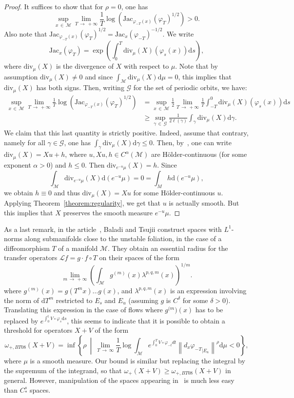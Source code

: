 \documentclass[AHL,Unicode,longabstracts,published]{cedram}
\newcommand{\mc}{\mathcal}
\newcommand{\M}{\mathcal{M}}
\newcommand{\ClL}{\mathcal{L}}
\newcommand{\dd}{\mathrm{d}}
\newcommand{\divv}{\mathrm{div}}
\newcommand{\Jac}{\mathrm{Jac}}
\begin{document}
\begin{proof}
It suffices to show that for $\rho=0$, one has
\[
\sup_{x\,\in\,\M} \lim_{T\,\to\,+\infty} \frac{1}{T}\log \left(\Jac_{\varphi_{-T}(x)}(\varphi_T)^{1/2} \right) > 0.
\]
Also note that $\Jac_{\varphi_{-T}(x)}(\varphi_T)^{1/2} = \Jac_{x}(\varphi_{-T})^{-1/2}$. We write
\[
\Jac_x(\varphi_{T}) = \exp\left(\int_0^T \divv_\mu(X)(\varphi_s(x)) \dd s \right),
\]
where $\divv_\mu(X)$ is the divergence of $X$ with respect to $\mu$. Note that by assumption $\divv_\mu(X) \neq 0$ and since $\int_{\M} \divv_\mu(X) \dd \mu = 0$, this implies that $\divv_\mu(X)$ has both signs. Then, writing $\mc{G}$ for the set of periodic orbits, we have:
\begin{align*}
\sup_{x\,\in\,\M} \lim_{T\,\to\,+\infty} \frac{1}{T}\log \left(\Jac_{\varphi_{-T}(x)}(\varphi_T)^{1/2} \right)& = \sup_{x\,\in\,\M} \frac{1}{2} \lim_{T\,\to\,+\infty} \frac{1}{T} \int_{-T}^{0} \divv_\mu(X)(\varphi_s(x)) \dd s \\
& \geq \sup_{\gamma\,\in\,\mc{G}} \frac{1}{2\ell(\gamma)} \int_\gamma \divv_\mu(X) \dd \gamma.
\end{align*}
We claim that this last quantity is strictly positive. Indeed, assume that contrary, namely for all $\gamma \in \mc{G}$, one has $\int_\gamma \divv_\mu(X) \dd \gamma \leq 0$. Then, by~\cite{Lopes-Thieullen-05}, one can write $\divv_\mu(X) = Xu + h$, where $u,Xu,h \in C^\alpha(\M)$ are H\"older-continuous (for some exponent $\alpha > 0$) and $h \leq 0$. Then $\divv_{e^{-u} \mu}(X) = h$. Since
\[
\int_{\M} \divv_{e^{-u }\mu}(X) \dd(e^{-u} \mu) = 0 = \int_{M} h \dd (e^{-u} \mu),
\]
we obtain $h \equiv 0$ and thus $\divv_\mu(X) = Xu$ for some H\"older-continuous $u$. Applying Theorem~\ref{theorem:regularity}, we get that $u$ is actually smooth. But this implies that $X$ preserves the smooth measure $e^{-u}\mu$.
\end{proof}

As a last remark, in the article~\cite{Baladi-Tsujii-08}, Baladi and Tsujii construct spaces with $L^1$-norms along submanifolds close to the unstable foliation, in the case of a diffeomorphism $T$ of a manifold $\M$. They obtain an essential radius for the transfer operators $\ClL f = g\cdot f\circ T$ on their spaces of the form
\[
\lim_{m\,\to\,+\infty} \left(\int_{\M} g^{(m)}(x) \lambda^{p,q,m}(x) \right)^{1/m}.
\]
where $g^{(m)}(x) = g(T^m x)\dots g(x)$, and $\lambda^{p,q,m}(x)$ is an expression involving the norm of $\dd T^m$ restricted to $E_s$ and $E_u$ (assuming $g$ is $C^\delta$ for some $\delta>0$). Translating this expression in the case of flows where $g^{(m})(x)$ has to be replaced by $e^{\int_0^t V \circ \varphi_s \dd s}$, this seems to indicate that it is possible to obtain a threshold for operators $X+V$ of the form
\[
\omega_{+,BT08}(X+V)=\inf\left\{ \rho \ \middle| \ \lim_{T\,\rightarrow \,\infty} \frac{1}{T}\log\int_{\M} e^{\int_0^T V\circ \varphi_{-t} dt} \left\|{d_x\varphi_{-T}}_{|E_u}\right\|^\rho \dd \mu < 0 \right\},
\]
where $\mu$ is a smooth measure. Our bound is similar but replacing the integral by the supremum of the integrand, so that $\omega_+(X+V) \geq \omega_{+,BT08}(X+V)$ in general. However, manipulation of the spaces appearing in~\cite{Baladi-Tsujii-08} is much less easy than $C^s_\ast$ spaces.




\end{document}
